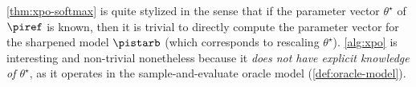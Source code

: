 {\begin{remark}
  \cref{thm:xpo-softmax} is quite stylized in the sense that if the parameter vector $\theta^\star$ of $\piref$ is known, then it
is trivial to directly compute the parameter vector for the sharpened
model $\pistarb$ (which corresponds to rescaling $\theta^{\star}$). \cref{alg:xpo} is interesting and
non-trivial nonetheless because it \emph{does not have explicit knowledge of
  $\theta^\star$}, as it operates in the sample-and-evaluate oracle
model (\cref{def:oracle-model}). 
\end{remark}
}





